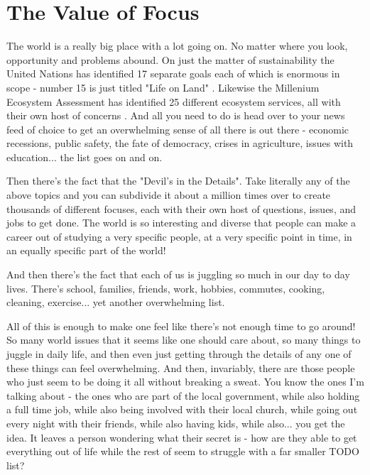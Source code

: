 \documentclass[11pt]{book}
\begin{document}
\chapter{The Value of Focus}
The world is a really big place with a lot going on. No matter where you look, opportunity and problems abound. On just the matter of sustainability the United Nations has identified 17 separate goals each of which is enormous in scope - number 15 is just titled "Life on Land" \cite{united}. Likewise the Millenium Ecosystem Assessment has identified 25 different ecosystem services, all with their own host of concerns \cite{mas}. And all you need to do is head over to your news feed of choice to get an overwhelming sense of all there is out there - economic recessions, public safety, the fate of democracy, crises in agriculture, issues with education... the list goes on and on.
\newline

Then there's the fact that the "Devil's in the Details". Take literally any of the above topics and you can subdivide it about a million times over to create thousands of different focuses, each with their own host of questions, issues, and jobs to get done. The world is so interesting and diverse that people can make a career out of studying a very specific people, at a very specific point in time, in an equally specific part of the world! 
\newline

And then there's the fact that each of us is juggling so much in our day to day lives. There's school, families, friends, work, hobbies, commutes, cooking, cleaning, exercise... yet another overwhelming list. 
\newline

All of this is enough to make one feel like there's not enough time to go around! So many world issues that it seems like one should care about, so many things to juggle in daily life, and then even just getting through the details of any one of these things can feel overwhelming. And then, invariably, there are those people who just seem to be doing it all without breaking a sweat. You know the ones I'm talking about - the ones who are part of the local government, while also holding a full time job, while also being involved with their local church, while going out every night with their friends, while also having kids, while also... you get the idea. It leaves a person wondering what their secret is - how are they able to get everything out of life while the rest of seem to struggle with a far smaller TODO list?
\newline
\end{document}
